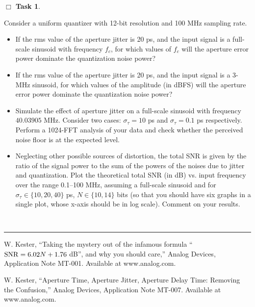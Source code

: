 \documentclass[11pt]{article}
\newcounter{ntask}
\newtheorem{task}[ntask]{$\Box$ Task}
\newenvironment{Task}
{\begin{task}\end{task} \vspace{-0.1in}\sf}
{\hfill \QED}
\def\QED{~\rule[-1pt]{5pt}{5pt}\par\medskip}
\begin{document}
\begin{Task}
Consider a uniform quantizer with 12-bit resolution and 100 MHz sampling rate.
\begin{itemize}

\item If the rms value of the aperture jitter is 20 ps, and the input signal is a full-scale sinusoid with frequency $f_c$, for which values of $f_c$ will the aperture error power dominate the quantization noise power?

\item If the rms value of the aperture jitter is 20 ps, and the input signal is a 3-MHz sinusoid, for which values of the amplitude (in dBFS) will the aperture error power dominate the quantization noise power?

\item Simulate the effect of aperture jitter on a full-scale sinusoid with frequency $40.03905$ MHz.
Consider two cases: $\sigma_\tau = 10$ ps and $\sigma_\tau=0.1$ ps respectively. 
Perform a 1024-FFT analysis of your data and check whether the perceived noise floor is at the expected level.

\item Neglecting other possible sources of distortion, the total SNR is given by the ratio of the signal power to the sum of the powers of the noises due to jitter and quantization. Plot the theoretical total SNR (in dB) vs. input frequency over the range 0.1--100 MHz, assuming a full-scale sinusoid and for $\sigma_\tau \in \{10,20,40\}$ ps, $N\in \{10, 14\}$ bits (so that you should have six graphs in a single plot, whose x-axis should be in log scale). Comment on your results.


\end{itemize}
\end{Task}





\begin{thebibliography}{10}

 W. Kester, ``Taking the mystery out of the infamous formula ``${\rm SNR} = 6.02N + 1.76$ dB'',
and why you should care,''  Analog Devices, Application Note MT-001. Available at www.analog.com.

 W. Kester, ``Aperture Time, Aperture Jitter, Aperture Delay Time: Removing the Confusion,''
Analog Devices, Application Note MT-007. Available at www.analog.com.

\end{thebibliography}
\end{document}
